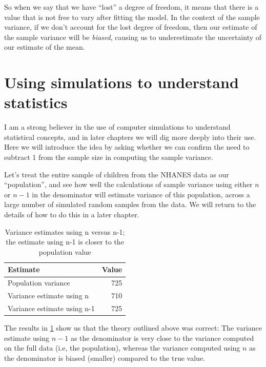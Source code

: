 \documentclass[12pt,]{book}
\theoremstyle{definition}
\theoremstyle{definition}
\theoremstyle{definition}
\theoremstyle{remark}
\begin{document}
So when we say that we have ``lost'' a degree of freedom, it means that there is a value that is not free to vary after fitting the model. In the context of the sample variance, if we don't account for the lost degree of freedom, then our estimate of the sample variance will be \emph{biased}, causing us to underestimate the uncertainty of our estimate of the mean.

\hypertarget{using-simulations-to-understand-statistics}{%
\section{Using simulations to understand statistics}\label{using-simulations-to-understand-statistics}}

I am a strong believer in the use of computer simulations to understand statistical concepts, and in later chapters we will dig more deeply into their use. Here we will introduce the idea by asking whether we can confirm the need to subtract 1 from the sample size in computing the sample variance.

Let's treat the entire sample of children from the NHANES data as our ``population'', and see how well the calculations of sample variance using either \(n\) or \(n-1\) in the denominator will estimate variance of this population, across a large number of simulated random samples from the data. We will return to the details of how to do this in a later chapter.

\begin{table}

\caption{\label{tab:varsim}Variance estimates using n versus n-1; the estimate using n-1 is closer to the population value}
\centering
\begin{tabular}[t]{l|r}
\hline
Estimate & Value\\
\hline
Population variance & 725\\
\hline
Variance estimate using n & 710\\
\hline
Variance estimate using n-1 & 725\\
\hline
\end{tabular}
\end{table}

The results in \ref{tab:varsim} show us that the theory outlined above was correct: The variance estimate using \(n - 1\) as the denominator is very close to the variance computed on the full data (i.e, the population), whereas the variance computed using \(n\) as the denominator is biased (smaller) compared to the true value.
\end{document}

